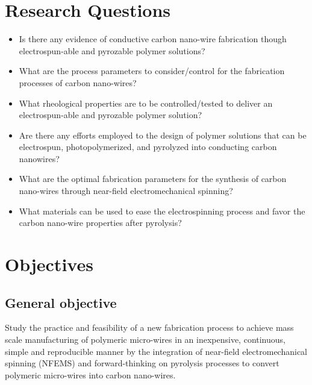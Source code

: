 \section{Research Questions}

\begin{itemize}
	\item{
	Is there any evidence of conductive carbon nano-wire fabrication though electrospun-able and pyrozable polymer solutions?
	}
	\item{
	What are the process parameters to consider/control for the fabrication processes of carbon nano-wires? 
	}
	\item{
	What rheological properties are to be controlled/tested to deliver an electrospun-able and pyrozable polymer solution?	
	}
	\item{
	Are there any efforts employed to the design of polymer solutions that can be electrospun, photopolymerized, and pyrolyzed into conducting carbon nanowires?
	}
	\item{
	What are the optimal fabrication parameters for the synthesis of carbon nano-wires through near-field electromechanical spinning?	
	}
	\item{
	What materials can be used to ease the electrospinning process and favor the carbon nano-wire properties after pyrolysis? 
	}
\end{itemize}

\section{Objectives}

\subsection{General objective}
Study the practice and feasibility of a new fabrication process to achieve mass scale manufacturing of polymeric micro-wires in an inexpensive, continuous, simple and reproducible manner by the integration of near-field electromechanical spinning (NFEMS) and forward-thinking on pyrolysis processes to convert polymeric micro-wires into carbon nano-wires.

